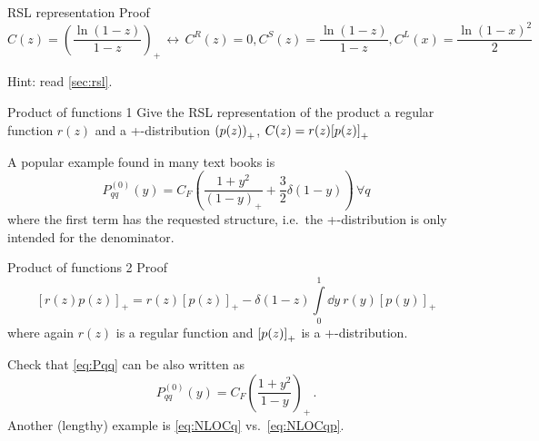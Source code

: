 \begin{exercisebox}[label=box:RSLD1]{RSL representation}
    Proof
    \begin{equation}
        C(z) = \left(\frac{\ln(1-z)}{1-z}\right)_+ \,\leftrightarrow\, C^R(z) = 0, C^S(z) = \frac{\ln(1-z)}{1-z}, C^L(x) = \frac{\ln(1-x)^2}{2}
    \end{equation}
\end{exercisebox}
\noindent{}Hint: read \cref{sec:rsl}.

\begin{exercisebox}[label=box:rslprod1]{Product of functions 1}
    Give the RSL representation of the product a regular function $r(z)$ and a +-distribution $\qty(p(z))_+$, $C(z) = r(z)\qty[p(z)]_+$
\end{exercisebox}
\noindent{}A popular example found in many text books is
\begin{equation}
    P_{qq}^{(0)}(y) = C_F\left( \frac{1+y^2}{(1-y)_+} + \frac 3 2 \delta(1-y)\right) \,\forall q \label{eq:Pqq}
\end{equation}
where the first term has the requested structure, i.e.\ the +-distribution is only intended for the denominator.

\begin{exercisebox}[label=box:rslprod2]{Product of functions 2}
    Proof
    \begin{equation}
        \left[r(z)p(z)\right]_+ = r(z) \left[p(z)\right]_+ - \delta(1-z) \int\limits_0^1 \! \dd y ~ r(y) \left[p(y)\right]_+
    \end{equation}
    where again $r(z)$ is a regular function and $\qty[p(z)]_+$ is a +-distribution.
\end{exercisebox}
\noindent{}Check that \cref{eq:Pqq} can be also written as
\begin{equation}
    P_{qq}^{(0)}(y) = C_F\left( \frac{1+y^2}{1-y}\right)_+ \,.
\end{equation}
Another (lengthy) example is \cref{eq:NLOCq} vs.\ \cref{eq:NLOCqp}.

